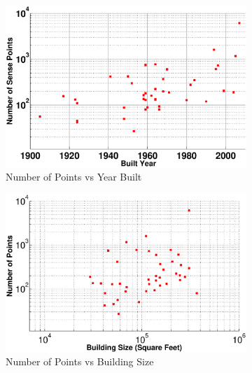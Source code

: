\begin{figure}[ht]
\centering
	\begin{subfigure}{0.48\textwidth}
                \centering
		\includegraphics[width=\textwidth]{./figs/pts_vs_yearbuilt.eps}
                \caption{Number of Points vs Year Built}
                \label{fig:sense_pts_data_yb}
	\end{subfigure}
	\begin{subfigure}{0.48\textwidth}
                \centering
		\includegraphics[width=\textwidth]{./figs/pts_vs_buildsz.eps}
                \caption{Number of Points vs Building Size}
                \label{fig:sense_pts_data_bs}
	\end{subfigure}
\caption{}
\label{fig:sense_pts_data}
\end{figure}



